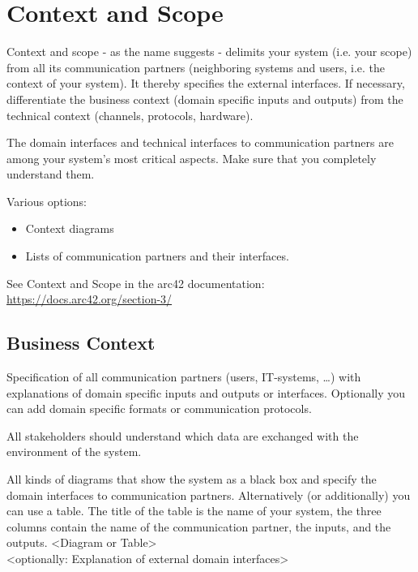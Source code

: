 \section{Context and Scope}

Context and scope - as the name suggests - delimits your system (i.e. your scope) from all its communication partners (neighboring systems and users, i.e. the context of your system). It thereby specifies the external interfaces.
If necessary, differentiate the business context (domain specific inputs and outputs) from the technical context (channels, protocols, hardware).

The domain interfaces and technical interfaces to communication partners are among your system’s most critical aspects. Make sure that you completely understand them.

Various options:
\begin{itemize}
  \item Context diagrams
  \item Lists of communication partners and their interfaces.
\end{itemize}

See Context and Scope in the arc42 documentation:
\href{https://docs.arc42.org/section-3/}{https://docs.arc42.org/section-3/}

\subsection{Business Context}

Specification of all communication partners (users, IT-systems, \dots) with explanations of domain specific inputs and outputs or interfaces. Optionally you can add domain specific formats or communication protocols.

All stakeholders should understand which data are exchanged with the environment of the system.

All kinds of diagrams that show the system as a black box and specify the domain interfaces to communication partners.
Alternatively (or additionally) you can use a table. The title of the table is the name of your system, the three columns contain the name of the communication partner, the inputs, and the outputs.
\textless Diagram or Table\textgreater\\
\textless optionally: Explanation of external domain interfaces\textgreater


